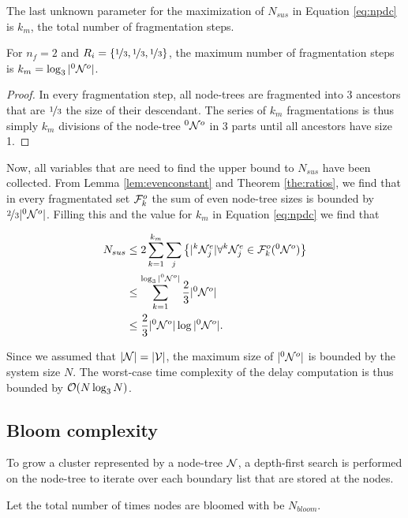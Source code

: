 The last unknown parameter for the maximization of $N_{sus}$ in Equation \eqref{eq:npdc} is $k_m$, the total number of fragmentation steps.

\begin{theorem}
  For $n_f = 2$ and $R_i = \{\nicefrac{1}{3},\nicefrac{1}{3},\nicefrac{1}{3}\}$, the maximum number of fragmentation steps is $k_m = \log_3{\lvert{}^{0}\mathcal{N}^o\rvert}$.
\end{theorem}
\begin{proof}
  In every fragmentation step, all node-trees are fragmented into 3 ancestors that are $\nicefrac{1}{3}$ the size of their descendant. The series of $k_m$ fragmentations is thus simply $k_m$ divisions of the node-tree ${}^{0}\mathcal{N}^o$ in 3 parts until all ancestors have size 1.
\end{proof}

Now, all variables that are need to find the upper bound to $N_{sus}$ have been collected. From Lemma \ref{lem:evenconstant} and Theorem \ref{the:ratios}, we find that in every fragmentated set $\mathcal{F}^o_k$ the sum of even node-tree sizes is bounded by $\nicefrac{2}{3}\lvert{}^{0}\mathcal{N}^o\rvert$. Filling this and the value for $k_m$ in Equation \eqref{eq:npdc} we find that

\begin{align}
  \nonumber N_{sus} &\leq 2\sum_{k=1}^{k_{m}}{ \sum_j{ \left\{ \lvert{}^{k}\mathcal{N}_j^e\rvert \forall {}^{k}\mathcal{N}_j^e \in \mathcal{F}^o_k({}^{0}\mathcal{N}^o)\right\} } } \\
  \nonumber         &\leq \sum_{k=1}^{\log_3{\lvert{}^{0}\mathcal{N}^o\rvert}} \frac{2}{3}\lvert{}^{0}\mathcal{N}^o\rvert\\
                    &\leq \frac{2}{3}\lvert{}^{0}\mathcal{N}^o\rvert\log{\lvert {}^{0} \mathcal{N}^o\rvert}.
\end{align}

Since we assumed that $\lvert\mathcal{N}\rvert = \lvert\mathcal{V}\rvert$, the maximum size of $\lvert{}^{0}\mathcal{N}^o\rvert$ is bounded by the system size $N$. The worst-case time complexity of the delay computation is thus bounded by $\mathcal{O}(N\log_3{N})$. 

\subsection{Bloom complexity}\label{sec:bloomcomplexity}

To grow a cluster represented by a node-tree $\mathcal{N}$, a depth-first search is performed on the node-tree to iterate over each boundary list that are stored at the nodes.
\begin{definition}\label{def:nbloom}
  Let the total number of times nodes are bloomed with  be $N_{bloom}$.
\end{definition}

